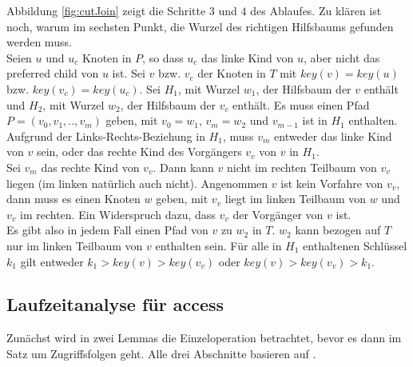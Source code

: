 \documentclass[a4paper,12pt]{article}
\begin{document}
Abbildung \ref{fig:cutJoin} zeigt die Schritte $3$ und $4$ des Ablaufes.
Zu klären ist noch, warum im sechsten Punkt, die Wurzel des richtigen Hilfsbaums gefunden werden muss.\\ Seien $u$ und $u_c$ Knoten in $P$, so dass $u_c$ das linke Kind von $u$, aber nicht das preferred child von $u$ ist. Sei $v$ bzw. $v_c$ der Knoten in $T$ mit $\mathit{key}\left(v\right) = \mathit{key}\left(u\right)$ bzw. $\mathit{key}\left(v_c\right) = \mathit{key}\left(u_c\right)$. Sei $H_1$, mit Wurzel $w_1$, der Hilfsbaum der $v$ enthält und $H_2$, mit Wurzel $w_2$, der Hilfsbaum der $v_c$ enthält. Es muss einen Pfad $P = \left(v_0, v_1,.., v_m \right)$ geben, mit $v_0 = w_1$, $v_m = w_2$ und $v_{m-1}$ ist in $H_1$ enthalten. Aufgrund der Links-Rechts-Beziehung in $H_1$, muss $v_m$ entweder das linke Kind von $v$ sein, oder das rechte Kind des Vorgängers $v_v$ von $v$ in $H_1$. \\
Sei $v_m$ das rechte Kind von $v_v$. Dann kann $v$ nicht im rechten Teilbaum von $v_v$ liegen (im linken natürlich auch nicht). Angenommen $v$ ist kein Vorfahre von $v_v$, dann muss es einen Knoten $w$ geben, mit $v_v$ liegt im linken Teilbaum von $w$ und $v_v$ im rechten. Ein Widerspruch dazu, dass $v_v$ der Vorgänger von $v$ ist.\\
Es gibt also in jedem Fall einen Pfad von $v$ zu $w_2$ in $T$. $w_2$ kann bezogen auf $T$ nur im linken Teilbaum von $v$ enthalten sein. Für alle in $H_1$ enthaltenen Schlüssel $k_1$ gilt entweder $k_1 > \mathit{key}\left(v\right) > \mathit{key}\left(v_v\right) $ oder  $ \mathit{key}\left(v\right) > \mathit{key}\left(v_v\right) > k_1 $. 


\subsection{Laufzeitanalyse für access}
Zunächst wird in zwei Lemmas die Einzeloperation betrachtet, bevor es dann im Satz um Zugriffsfolgen geht. Alle drei Abschnitte basieren auf \cite{demainDinamicOpti}.
\end{document}
